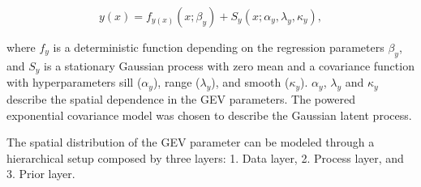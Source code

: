 \documentclass[12pt,a4paper,english]{article}
\begin{document}
\begin{equation}
y(x) = f_{y(x)}(x;\beta_{y}) + S_{y}(x;\alpha_{y},\lambda_{y},\kappa_{y}),
\end{equation}

\noindent where $f_{y}$ is a deterministic function depending on the regression parameters $\beta_{y}$, and $S_{y}$ is a stationary Gaussian process with zero mean and a covariance function with hyperparameters sill ($\alpha_{y}$), range ($\lambda_{y}$), and smooth ($\kappa_{y}$). $\alpha_{y}$, $\lambda_{y}$ and $\kappa_{y}$ describe the spatial dependence in the GEV parameters. The powered exponential covariance model was chosen to describe the Gaussian latent process.

The spatial distribution of the GEV parameter can be modeled through a hierarchical setup composed by three layers: 1. Data layer, 2. Process layer, and 3. Prior layer. 
	
\end{document}
